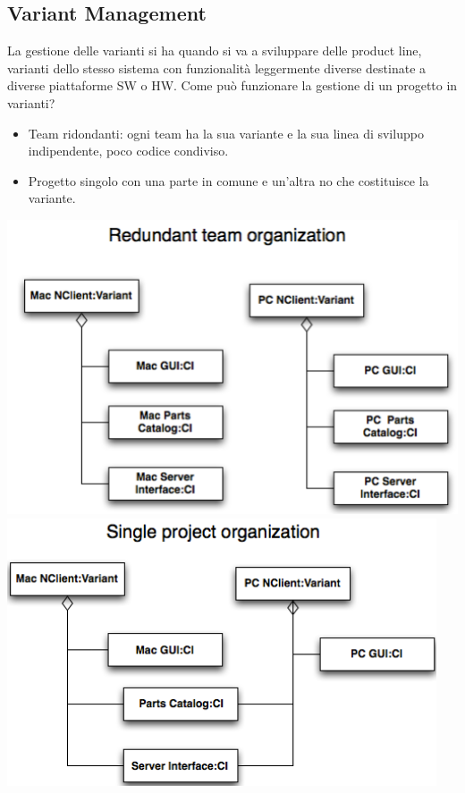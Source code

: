 \documentclass[10pt,a4paper]{book}
\begin{document}
\subsection{Variant Management}
La gestione delle varianti si ha quando si va a sviluppare delle product line, varianti dello stesso sistema con funzionalità leggermente diverse destinate a diverse piattaforme SW o HW.
Come può funzionare la gestione di un progetto in varianti?
\begin{itemize}
\item Team ridondanti: ogni team ha la sua variante e la sua linea di sviluppo indipendente, poco codice condiviso.
\item Progetto singolo con una parte in comune e un'altra no che costituisce la variante.\\
\end{itemize}
\includegraphics[scale=0.35]{redu.png} 
\includegraphics[scale=0.35]{single.png} \\ \\
\end{document}
